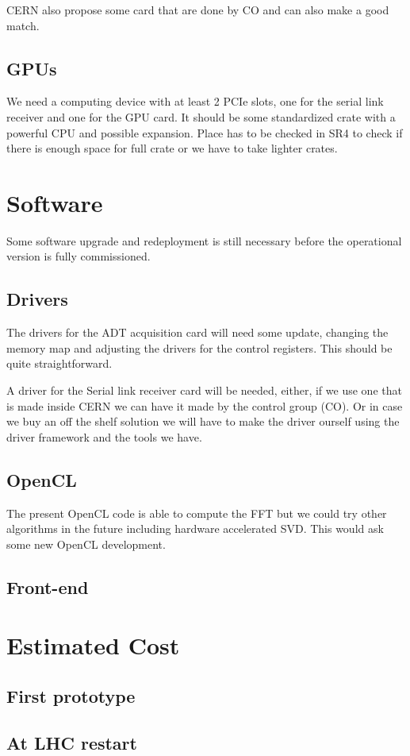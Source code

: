 	\gls{CERN} also propose some card that are done by \gls{CO} and can also make a good match.

	\subsection{GPUs}

	We need a computing device with at least 2 PCIe slots, one for the serial link receiver and one for the \gls{GPU} card. It should be some standardized crate with a powerful \gls{CPU} and possible expansion. Place has to be checked in SR4 to check if there is enough space for full crate or we have to take lighter crates.

\section{Software}

Some software upgrade and redeployment is still necessary before the operational version is fully commissioned.

	\subsection{Drivers}

	The drivers for the \gls{ADT} acquisition card will need some update, changing the memory map and adjusting the drivers for the control registers. This should be quite straightforward.

	A driver for the Serial link receiver card will be needed, either, if we use one that is made inside \gls{CERN} we can have it made by the control group (CO). Or in case we buy an off the shelf solution we will have to make the driver ourself using the driver framework and the tools we have.

	\subsection{OpenCL}

	The present \gls{OpenCL} code is able to compute the \gls{FFT} but we could try other algorithms in the future including hardware accelerated \gls{SVD}. This would ask some new \gls{OpenCL} development.

	\subsection{Front-end}

	

\section{Estimated Cost}

	\subsection{First prototype}

	\subsection{At LHC restart}